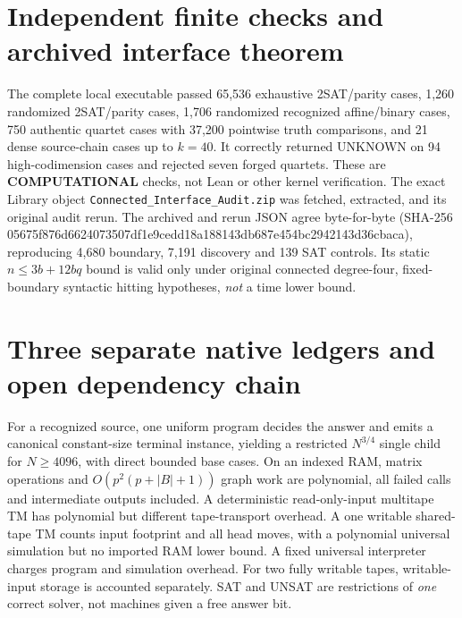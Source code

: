 \documentclass[11pt]{article}
\begin{document}
\section{Independent finite checks and archived interface theorem}
The complete local executable passed 65,536 exhaustive 2SAT/parity cases, 1,260 randomized 2SAT/parity cases, 1,706 randomized recognized affine/binary cases, 750 authentic quartet cases with 37,200 pointwise truth comparisons, and 21 dense source-chain cases up to \(k=40\). It correctly returned UNKNOWN on 94 high-codimension cases and rejected seven forged quartets. These are \textbf{COMPUTATIONAL} checks, not Lean or other kernel verification. The exact Library object \texttt{Connected\_Interface\_Audit.zip} was fetched, extracted, and its original audit rerun. The archived and rerun JSON agree byte-for-byte (SHA-256 05675f876d6624073507df1e9cedd18a188143db687e454bc2942143d36cbaca), reproducing 4,680 boundary, 7,191 discovery and 139 SAT controls. Its static \(n\le3b+12bq\) bound is valid only under original connected degree-four, fixed-boundary syntactic hitting hypotheses, \emph{not} a time lower bound.
\section{Three separate native ledgers and open dependency chain}
For a recognized source, one uniform program decides the answer and emits a canonical constant-size terminal instance, yielding a restricted \(N^{3/4}\) single child for \(N\ge4096\), with direct bounded base cases. On an indexed RAM, matrix operations and \(O(p^2(p+|B|+1))\) graph work are polynomial, all failed calls and intermediate outputs included. A deterministic read-only-input multitape TM has polynomial but different tape-transport overhead. A one writable shared-tape TM counts input footprint and all head moves, with a polynomial universal simulation but no imported RAM lower bound. A fixed universal interpreter charges program and simulation overhead. For two fully writable tapes, writable-input storage is accounted separately. SAT and UNSAT are restrictions of \emph{one} correct solver, not machines given a free answer bit.
\end{document}
